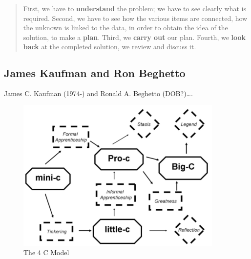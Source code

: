 \begin{quotation}
  First, we have to \textbf{understand} the problem; we have to see clearly what is required. Second, we have to see how the various items are connected, how the unknown is linked to the data, in order to obtain the idea of the solution, to make a \textbf{plan}. Third, we \textbf{carry out} our plan. Fourth, we \textbf{look back} at the completed solution, we review and discuss it. 
\end{quotation}


\subsection*{James Kaufman and Ron Beghetto}

James C. Kaufman (1974-) and Ronald A. Beghetto (DOB?)\ldots\autocite[See][]{Kaufman2009}.

\begin{figure}[!htbp] %
  \centering
  \includegraphics[width=\linewidth]{images/4C.png}
\caption[The 4 C Model]{The 4 C Model}
\label{fig:4C}
\end{figure}


